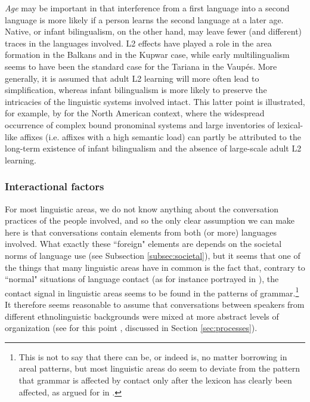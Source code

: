 \documentclass[output=paper]{langscibook}
\begin{document}
\textit{Age} may be important in that interference from a first language into a second language is more likely if a person learns the second language at a later age. Native, or infant bilingualism, on the other hand, may leave fewer (and different) traces in the languages involved. L2 effects have played a role in the area formation in the Balkans and in the Kupwar case, while early multilingualism seems to have been the standard case for the Tariana in the Vaupés. More generally, it is assumed that adult L2 learning will more often lead to simplification, whereas infant bilingualism is more likely to preserve the intricacies of the linguistic systems involved intact. This latter point is illustrated, for example, by \textcite{mithun2015morphological} for the North American context, where the widespread occurrence of complex bound pronominal systems and large inventories of lexical-like affixes (i.e. affixes with a high semantic load) can partly be attributed to the long-term existence of infant bilingualism and the absence of large-scale adult L2 learning.

\subsubsection{Interactional factors}

For most linguistic areas, we do not know anything about the conversation practices of the people involved, and so the only clear assumption we can make here is that conversations contain elements from both (or more) languages involved. What exactly these ``foreign" elements are depends on the societal norms of language use (see Subsection \ref{subsec:societal}), but it seems that one of the things that many linguistic areas have in common is the fact that, contrary to ``normal" situations of language contact (as for instance portrayed in \cite{thomasonetal1988language}), the contact signal in linguistic areas seems to be found in the patterns of grammar.\footnote{This is not to say that there can be, or indeed is, no matter borrowing in areal patterns, but most linguistic areas do seem to deviate from the pattern that grammar is affected by contact only after the lexicon has clearly been affected, as argued for in \textcite{thomasonetal1988language}.} It therefore seems reasonable to assume that conversations between speakers from different ethnolinguistic backgrounds were mixed at more abstract levels of organization (see for this point \citealt{Matras2011Explaining}, discussed in Section \ref{sec:processes}).
\end{document}
